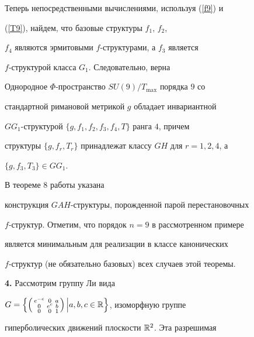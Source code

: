 Теперь непосредственными вычислениями, используя (\ref{f9}) и


(\ref{T9}), найдем, что базовые структуры $f_1$, $f_2$,


$f_4$ являются эрмитовыми $f$-структурами, а $f_3$ является


$f$-структурой класса $G_1$. Следовательно, верна





\begin{thm}


Однородное $\Phi$-пространство $SU(9)/T_{\max}$ порядка $9$ со


стандартной римановой метрикой $g$ обладает инвариантной


$GG_1$-структурой $\{g,f_1,f_2,f_3,f_4,T\}$ ранга $4$, причем


структуры $\{g,f_r,T_r\}$ принадлежат классу $GH$ для $r=1,2,4$, а


$\{g,f_3,T_3\}\in GG_1$.


\end{thm}





\begin{note}


В теореме 8 работы \cite{21} указана


конструкция $GAH$-структуры, порожденной парой перестановочных


$f$-структур. Отметим, что порядок $n=9$ в рассмотренном примере


является минимальным для реализации в классе канонических


$f$-структур (не обязательно базовых) всех случаев этой теоремы.


\end{note}





{\bf 4.} Рассмотрим группу Ли вида


$G=\left\{\left(\begin{smallmatrix}


e^{-c} & 0 & a \\  0 & e^c & b \\  0 & 0 & 1


\end{smallmatrix}\right)\Big|a,b,c\in \Bbb{R}\right\}$, изоморфную группе


гиперболических движений плоскости $\Bbb{R}^2$. Эта разрешимая


